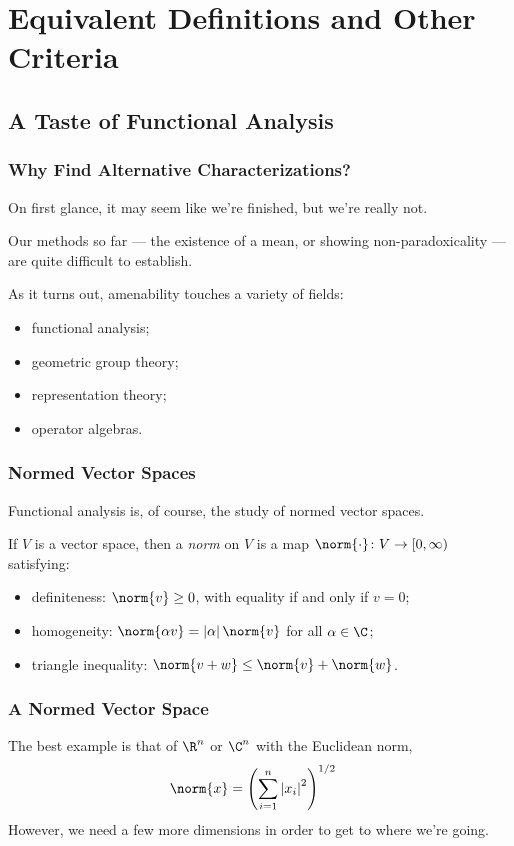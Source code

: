 \documentclass{beamer-custom}
\begin{document}
\section{Equivalent Definitions and Other Criteria}%
\subsection{A Taste of Functional Analysis}%
\begin{frame}
  \frametitle{Why Find Alternative Characterizations?}
  On first glance, it may seem like we're finished, but we're really not.\pause\newline

  Our methods so far --- the existence of a mean, or showing non-paradoxicality --- are quite difficult to establish.\pause\newline

  As it turns out, amenability touches a variety of fields:
  \begin{itemize}
    \item functional analysis;
    \item geometric group theory;
    \item representation theory;
    \item operator algebras.
  \end{itemize}
\end{frame}
\begin{frame}
  \frametitle{Normed Vector Spaces}
  Functional analysis is, of course, the study of normed vector spaces.\pause\newline

  If $V$ is a vector space, then a \textit{norm} on $V$ is a map $\norm{\cdot}\colon V\rightarrow [0,\infty)$ satisfying:\pause
  \begin{itemize}
    \item definiteness: $\norm{v} \geq 0$, with equality if and only if $v = 0$;\pause
    \item homogeneity: $\norm{\alpha v} = \left\vert \alpha \right\vert\norm{v}$ for all $\alpha\in \C$;\pause
    \item triangle inequality: $\norm{v + w}\leq \norm{v} + \norm{w}$.
  \end{itemize}
\end{frame}
\begin{frame}
  \frametitle{A Normed Vector Space}
  The best example is that of $\R^n$ or $\C^n$ with the Euclidean norm,
  \begin{align*}
    \norm{x} &= \left( \sum_{i=1}^{n}\left\vert x_i \right\vert^2 \right)^{1/2}
  \end{align*}
  However, we need a few more dimensions in order to get to where we're going.
\end{frame}
\end{document}
